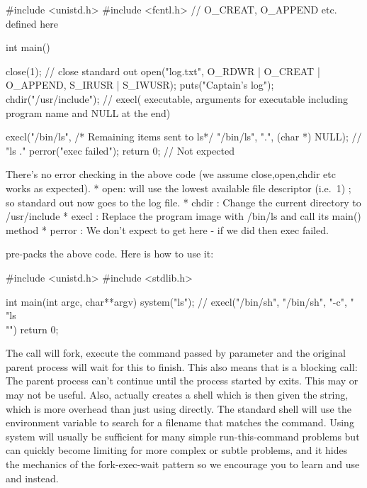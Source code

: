 \begin{code}[language=C]
#include <unistd.h>
#include <fcntl.h> // O_CREAT, O_APPEND etc. defined here

int main() {
   close(1); // close standard out
   open("log.txt", O_RDWR | O_CREAT | O_APPEND, S_IRUSR | S_IWUSR);
   puts("Captain's log");
   chdir("/usr/include");
   // execl( executable,  arguments for executable including program name and NULL at the end)

   execl("/bin/ls", /* Remaining items sent to ls*/ "/bin/ls", ".", (char *) NULL); // "ls ."
   perror("exec failed");
   return 0; // Not expected
}
\end{code}

There's no error checking in the above code (we assume close,open,chdir etc works as expected). * open: will use the lowest available file descriptor (i.e.~1) ; so standard out now goes to the log file. * chdir : Change the current directory to /usr/include * execl : Replace the program image with /bin/ls and call its main() method * perror : We don't expect to get here - if we did then exec failed.

 pre-packs the above code. Here is how to use it:

\begin{code}[language=C]

#include <unistd.h>
#include <stdlib.h>

int main(int argc, char**argv) {
  system("ls"); // execl("/bin/sh", "/bin/sh", "-c", "\\"ls\\"")
  return 0;
}
\end{code}

The  call will fork, execute the command passed by parameter and the original parent process will wait for this to finish. This also means that  is a blocking call: The parent process can't continue until the process started by  exits. This may or may not be useful. Also,  actually creates a shell which is then given the string, which is more overhead than just using  directly. The standard shell will use the  environment variable to search for a filename that matches the command. Using system will usually be sufficient for many simple run-this-command problems but can quickly become limiting for more complex or subtle problems, and it hides the mechanics of the fork-exec-wait pattern so we encourage you to learn and use   and  instead.

